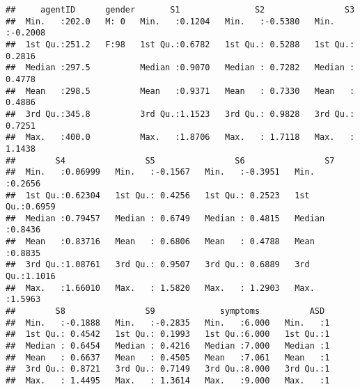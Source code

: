 \documentclass[]{article}
\newenvironment{Shaded}{\begin{snugshade}}{\end{snugshade}}
\newcommand{\KeywordTok}[1]{\textcolor[rgb]{0.13,0.29,0.53}{\textbf{#1}}}
\newcommand{\DecValTok}[1]{\textcolor[rgb]{0.00,0.00,0.81}{#1}}
\newcommand{\StringTok}[1]{\textcolor[rgb]{0.31,0.60,0.02}{#1}}
\newcommand{\CommentTok}[1]{\textcolor[rgb]{0.56,0.35,0.01}{\textit{#1}}}
\newcommand{\OperatorTok}[1]{\textcolor[rgb]{0.81,0.36,0.00}{\textbf{#1}}}
\newcommand{\NormalTok}[1]{#1}
\begin{document}
\begin{verbatim}
##     agentID      gender       S1               S2                S3         
##  Min.   :202.0   M: 0   Min.   :0.1204   Min.   :-0.5380   Min.   :-0.2008  
##  1st Qu.:251.2   F:98   1st Qu.:0.6782   1st Qu.: 0.5288   1st Qu.: 0.2816  
##  Median :297.5          Median :0.9070   Median : 0.7282   Median : 0.4778  
##  Mean   :298.5          Mean   :0.9371   Mean   : 0.7330   Mean   : 0.4886  
##  3rd Qu.:345.8          3rd Qu.:1.1523   3rd Qu.: 0.9828   3rd Qu.: 0.7251  
##  Max.   :400.0          Max.   :1.8706   Max.   : 1.7118   Max.   : 1.1438  
##        S4                S5                S6                S7        
##  Min.   :0.06999   Min.   :-0.1567   Min.   :-0.3951   Min.   :0.2656  
##  1st Qu.:0.62304   1st Qu.: 0.4256   1st Qu.: 0.2523   1st Qu.:0.6959  
##  Median :0.79457   Median : 0.6749   Median : 0.4815   Median :0.8436  
##  Mean   :0.83716   Mean   : 0.6806   Mean   : 0.4788   Mean   :0.8835  
##  3rd Qu.:1.08761   3rd Qu.: 0.9507   3rd Qu.: 0.6889   3rd Qu.:1.1016  
##  Max.   :1.66010   Max.   : 1.5820   Max.   : 1.2903   Max.   :1.5963  
##        S8                S9             symptoms          ASD   
##  Min.   :-0.1888   Min.   :-0.2835   Min.   :6.000   Min.   :1  
##  1st Qu.: 0.4542   1st Qu.: 0.1993   1st Qu.:6.000   1st Qu.:1  
##  Median : 0.6454   Median : 0.4216   Median :7.000   Median :1  
##  Mean   : 0.6637   Mean   : 0.4505   Mean   :7.061   Mean   :1  
##  3rd Qu.: 0.8721   3rd Qu.: 0.7149   3rd Qu.:8.000   3rd Qu.:1  
##  Max.   : 1.4495   Max.   : 1.3614   Max.   :9.000   Max.   :1
\end{verbatim}

\begin{Shaded}
\end{Shaded}
\end{document}
